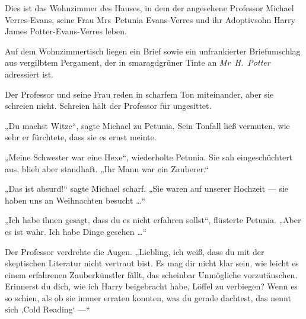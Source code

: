 Dies ist das Wohnzimmer des Hauses, in dem der angesehene Professor Michael Verres-Evans, seine Frau Mrs~Petunia Evans-Verres und ihr Adoptivsohn Harry James Potter-Evans-Verres leben.

Auf dem Wohnzimmertisch liegen ein Brief sowie ein unfrankierter Briefumschlag aus vergilbtem Pergament, der in smaragdgrüner Tinte an \emph{Mr~H.~Potter} adressiert ist.

Der Professor und seine Frau reden in scharfem Ton miteinander, aber sie schreien nicht. Schreien hält der Professor für ungesittet.

„Du machst Witze“, sagte Michael zu Petunia. Sein Tonfall ließ vermuten, wie sehr er fürchtete, dass sie es ernst meinte.

„Meine Schwester war eine Hexe“, wiederholte Petunia. Sie sah eingeschüchtert aus, blieb aber standhaft.
„Ihr Mann war ein Zauberer.“

„Das ist absurd!“ sagte Michael scharf.
„Sie waren auf unserer Hochzeit — sie haben uns an Weihnachten besucht …“

„Ich habe ihnen gesagt, dass du es nicht erfahren sollst“, flüsterte Petunia.
„Aber es ist wahr. Ich habe Dinge gesehen …“

Der Professor verdrehte die Augen.
„Liebling, ich weiß, dass du mit der skeptischen Literatur nicht vertraut bist. Es mag dir nicht klar sein, wie leicht es einem erfahrenen Zauberkünstler fällt, das scheinbar Unmögliche vorzutäuschen. Erinnerst du dich, wie ich Harry beigebracht habe, Löffel zu verbiegen? Wenn es so schien, als ob sie immer erraten konnten, was du gerade dachtest, das nennt sich ‚Cold Reading‘ —“ %

